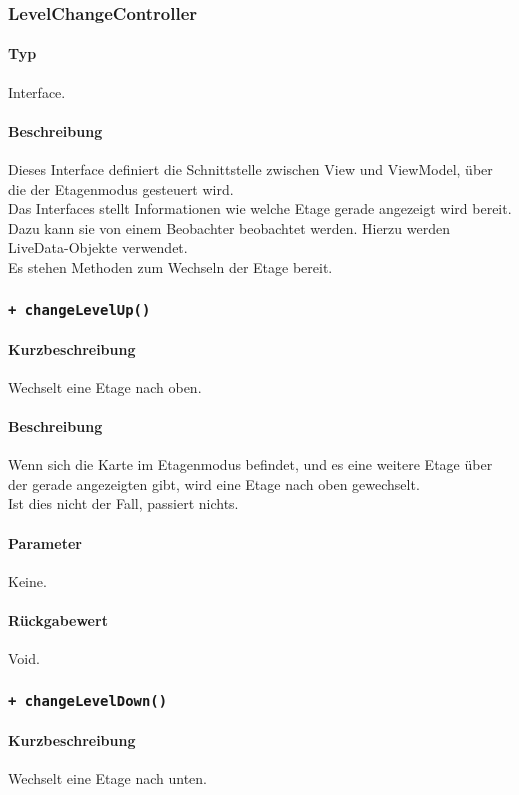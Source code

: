 \subsubsection{LevelChangeController}
\paragraph*{Typ}
Interface.
\paragraph*{Beschreibung}
Dieses Interface definiert die Schnittstelle zwischen View und ViewModel, über die 
der Etagenmodus gesteuert wird.\\
Das Interfaces stellt Informationen wie welche Etage gerade angezeigt wird bereit.
Dazu kann sie von einem Beobachter beobachtet werden. Hierzu werden LiveData-Objekte verwendet.\\
Es stehen Methoden zum Wechseln der Etage bereit.\\

\subsubsection*{\texttt{+ changeLevelUp()}}%
\paragraph*{Kurzbeschreibung}
Wechselt eine Etage nach oben.
\paragraph*{Beschreibung}
Wenn sich die Karte im Etagenmodus befindet, und es eine weitere Etage über der gerade 
angezeigten gibt, wird eine Etage nach oben gewechselt.\\
Ist dies nicht der Fall, passiert nichts.
\paragraph*{Parameter}
Keine.
\paragraph*{Rückgabewert}
Void.

\subsubsection*{\texttt{+ changeLevelDown()}}%
\paragraph*{Kurzbeschreibung}
Wechselt eine Etage nach unten.

